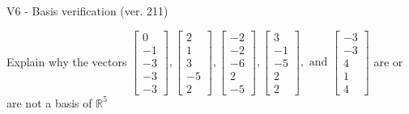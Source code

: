 \begin{exercise}
  \begin{exerciseTitle}V6 - Basis verification (ver. 211)\end{exerciseTitle}
  \begin{exerciseStatement}
    Explain why the vectors \(\left[\begin{array}{r}
0 \\
-1 \\
-3 \\
-3 \\
-3
\end{array}\right] , \left[\begin{array}{r}
2 \\
1 \\
3 \\
-5 \\
2
\end{array}\right] , \left[\begin{array}{r}
-2 \\
-2 \\
-6 \\
2 \\
-5
\end{array}\right] , \left[\begin{array}{r}
3 \\
-1 \\
-5 \\
2 \\
2
\end{array}\right] , \text{ and } \left[\begin{array}{r}
-3 \\
-3 \\
4 \\
1 \\
4
\end{array}\right]\) are or are not a basis of \(\mathbb{R}^5\)	



\end{exerciseStatement}
\end{exercise}
